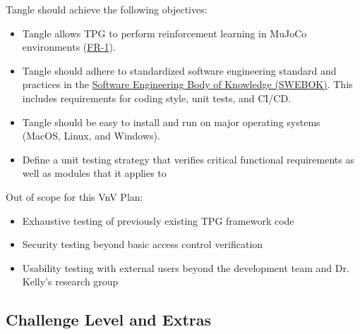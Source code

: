 \documentclass[12pt, titlepage]{article}
\begin{document}
Tangle should achieve the following objectives:
\begin{itemize}
\item Tangle allows TPG to perform reinforcement learning in MuJoCo environments (\href{https://github.com/TPGEngine/tpg/blob/main/docs/SRS/SRS.pdf}{FR-1}).
\item Tangle should adhere to standardized software engineering standard and practices in the \href{https://www.computer.org/education/bodies-of-knowledge/software-engineering}{Software Engineering Body of Knowledge (SWEBOK)}. This includes requirements for coding style, unit tests, and CI/CD.
\item Tangle should be easy to install and run on major operating systems (MacOS, Linux, and Windows).
\item Define a unit testing strategy that verifies critical functional requirements as well as modules that it applies to 
\end{itemize}

Out of scope for this VnV Plan:
\begin{itemize}
\item Exhaustive testing of previously existing TPG framework code
\item Security testing beyond basic access control verification
\item Usability testing with external users beyond the development team and Dr. Kelly's research group
\end{itemize}

\subsection{Challenge Level and Extras}


\end{document}
